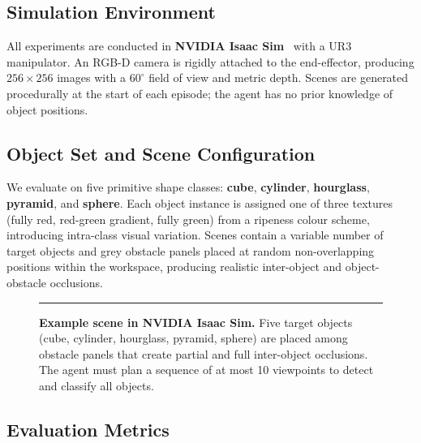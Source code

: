 \documentclass{article}
\begin{document}
\subsection{Simulation Environment}

All experiments are conducted in \textbf{NVIDIA Isaac Sim}~\citep{mittal2023orbit} with a UR3 manipulator. An RGB-D camera is rigidly attached to the end-effector, producing $256 \times 256$ images with a $60^\circ$ field of view and metric depth. Scenes are generated procedurally at the start of each episode; the agent has no prior knowledge of object positions.

\subsection{Object Set and Scene Configuration}
\label{sec:scene}

We evaluate on five primitive shape classes: \textbf{cube}, \textbf{cylinder}, \textbf{hourglass}, \textbf{pyramid}, and \textbf{sphere}. Each object instance is assigned one of three textures (fully red, red-green gradient, fully green) from a ripeness colour scheme, introducing intra-class visual variation. Scenes contain a variable number of target objects and grey obstacle panels placed at random non-overlapping positions within the workspace, producing realistic inter-object and object-obstacle occlusions.

\begin{figure}[htbp]
  \centering
  \rule{0.92\textwidth}{5cm}   %
  \caption{\textbf{Example scene in NVIDIA Isaac Sim.} Five target objects (cube, cylinder, hourglass, pyramid, sphere) are placed among obstacle panels that create partial and full inter-object occlusions. The agent must plan a sequence of at most 10 viewpoints to detect and classify all objects.}
  \label{fig:scene}
\end{figure}

\subsection{Evaluation Metrics}
\end{document}
